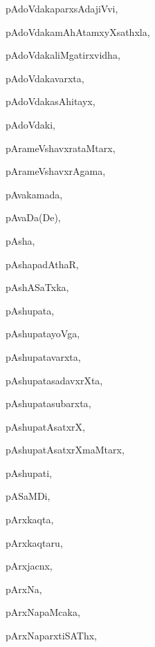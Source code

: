 \begin{multicols}{3}
{\noindent
{pAdoVdakaparxsAdajiVvi}, \pageref{pAdoVdakaparxsAdajiVvi}

\noindent
{pAdoVdakamAhAtamxyXsathxla}, \pageref{pAdoVdakamAhAtamxyXsathxla}

\noindent
{pAdoVdakaliMgatirxvidha}, \pageref{pAdoVdakaliMgatirxvidha}

\noindent
{pAdoVdakavarxta}, \pageref{pAdoVdakavarxta}

\noindent
{pAdoVdakasAhitayx}, \pageref{pAdoVdakasAhitayx}

\noindent
{pAdoVdaki}, \pageref{pAdoVdaki}

\noindent
{pArameVshavxrataMtarx}, \pageref{pArameVshavxrataMtarx}

\noindent
{pArameVshavxrAgama}, \pageref{pArameVshavxrAgama}

\noindent
{pAvakamada}, \pageref{pAvakamada}

\noindent
{pAvaDa(De)}, \pageref{pAvaDaDe}

\noindent
{pAsha}, \pageref{pAsha}

\noindent
{pAshapadAthaR}, \pageref{pAshapadAthaR}

\noindent
{pAshASaTxka}, \pageref{pAshASaTxka}

\noindent
{pAshupata}, \pageref{pAshupata}

\noindent
{pAshupatayoVga}, \pageref{pAshupatayoVga}

\noindent
{pAshupatavarxta}, \pageref{pAshupatavarxta}

\noindent
{pAshupatasadavxrXta}, \pageref{pAshupatasadavxrXta}

\noindent
{pAshupatasubarxta}, \pageref{pAshupatasubarxta}

\noindent
{pAshupatAsatxrX}, \pageref{pAshupatAsatxrX}

\noindent
{pAshupatAsatxrXmaMtarx}, \pageref{pAshupatAsatxrXmaMtarx}

\noindent
{pAshupati}, \pageref{pAshupati}

\noindent
{pASaMDi}, \pageref{pASaMDi}

\noindent
{pArxkaqta}, \pageref{pArxkaqta}

\noindent
{pArxkaqtaru}, \pageref{pArxkaqtaru}

\noindent
{pArxjacnx}, \pageref{pArxjacnx}

\noindent
{pArxNa}, \pageref{pArxNa}

\noindent
{pArxNapaMcaka}, \pageref{pArxNapaMcaka}

\noindent
{pArxNaparxtiSAThx}, \pageref{pArxNaparxtiSAThx}

}
\end{multicols}
